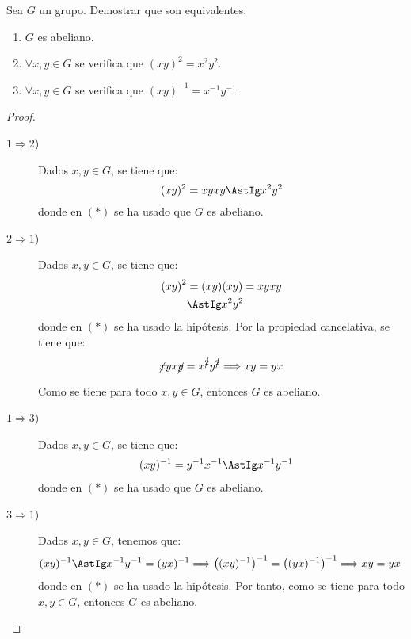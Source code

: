 \begin{ejercicio}\label{ej:2.7}
    Sea $G$ un grupo. Demostrar que son equivalentes:
    \begin{enumerate}
        \item $G$ es abeliano.
        \item $\forall x, y \in G$ se verifica que $(xy)^2 = x^2y^2$.
        \item $\forall x, y \in G$ se verifica que $(xy)^{-1} = x^{-1}y^{-1}$.
    \end{enumerate}
    \begin{proof}~
        \begin{description}
            \item[$1\Longrightarrow 2$)] Dados $x, y \in G$, se tiene que:
            \begin{equation*}
                (xy)^2 = xyxy \AstIg x^2y^2
            \end{equation*}
            donde en $(\ast)$ se ha usado que $G$ es abeliano.

            \item[$2\Longrightarrow 1$)] Dados $x, y \in G$, se tiene que:
            \begin{align*}
                \left(xy\right)^{2}
                &= (xy)(xy) = xyxy\\
                &\AstIg x^2y^2
            \end{align*}
            donde en $(\ast)$ se ha usado la hipótesis. Por la propiedad cancelativa, se tiene que:
            \begin{equation*}
                \cancel{x}yx\cancel{y} = x^{\cancel{2}}y^{\cancel{2}} \Longrightarrow xy = yx
            \end{equation*}

            Como se tiene para todo $x, y \in G$, entonces $G$ es abeliano.

            \item[$1\Longrightarrow 3$)] Dados $x, y \in G$, se tiene que:
            \begin{align*}
                (xy)^{-1}
                &= y^{-1}x^{-1} \AstIg x^{-1}y^{-1}
            \end{align*}
            donde en $(\ast)$ se ha usado que $G$ es abeliano.

            \item[$3\Longrightarrow 1$)] Dados $x, y \in G$, tenemos que:
            \begin{align*}
                (xy)^{-1} &\AstIg x^{-1}y^{-1} = (yx)^{-1}
                \Longrightarrow \left((xy)^{-1}\right)^{-1} = \left((yx)^{-1}\right)^{-1}
                \Longrightarrow xy = yx
            \end{align*}
            donde en $(\ast)$ se ha usado la hipótesis. Por tanto, como se tiene para todo $x, y \in G$, entonces $G$ es abeliano.
        \end{description}
    \end{proof}
\end{ejercicio}

